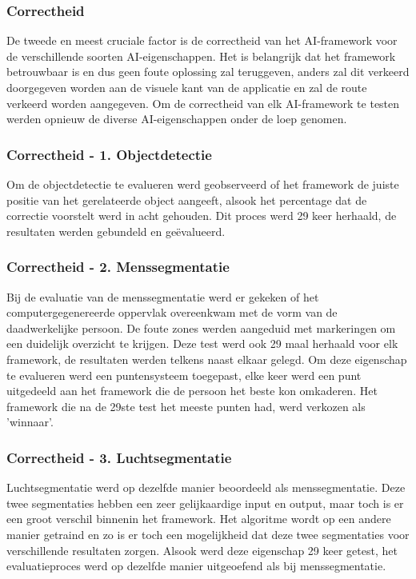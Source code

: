 \subsubsection{Correctheid}
De tweede en meest cruciale factor is de correctheid van het AI-framework voor de verschillende soorten AI-eigenschappen. Het is belangrijk dat het framework betrouwbaar is en dus geen foute oplossing zal teruggeven, anders zal dit verkeerd doorgegeven worden aan de visuele kant van de applicatie en zal de route verkeerd worden aangegeven. Om de correctheid van elk AI-framework te testen werden opnieuw de diverse AI-eigenschappen onder de loep genomen.

\subsubsection{Correctheid - 1.  Objectdetectie}
Om de objectdetectie te evalueren werd geobserveerd of het framework de juiste positie van het gerelateerde object aangeeft, alsook het percentage dat de correctie voorstelt werd in acht gehouden. Dit proces werd 29 keer herhaald, de resultaten werden gebundeld en geëvalueerd. 

\subsubsection{Correctheid - 2. Menssegmentatie}
Bij de evaluatie van de menssegmentatie werd er gekeken of het computergegenereerde oppervlak overeenkwam met de vorm van de daadwerkelijke persoon. De foute zones werden aangeduid met markeringen om een duidelijk overzicht te krijgen. Deze test werd ook 29 maal herhaald voor elk framework, de resultaten werden telkens naast elkaar gelegd. Om deze eigenschap te evalueren werd een puntensysteem toegepast, elke keer werd een punt uitgedeeld aan het framework die de persoon het beste kon omkaderen. Het framework die na de 29ste test het meeste punten had, werd verkozen als 'winnaar'.

\subsubsection{Correctheid - 3. Luchtsegmentatie}
Luchtsegmentatie werd op dezelfde manier beoordeeld als menssegmentatie. Deze twee segmentaties hebben een zeer gelijkaardige input en output, maar toch is er een groot verschil binnenin het framework. Het algoritme wordt op een andere manier getraind en zo is er toch een mogelijkheid dat deze twee segmentaties voor verschillende resultaten zorgen. Alsook werd deze eigenschap 29 keer getest, het evaluatieproces werd op dezelfde manier uitgeoefend als bij menssegmentatie.

